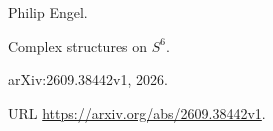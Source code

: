 Philip Engel.

\newblock Complex structures on {$S^6$}.

\newblock arXiv:2609.38442v1, 2026.

\newblock URL \url{https://arxiv.org/abs/2609.38442v1}.
